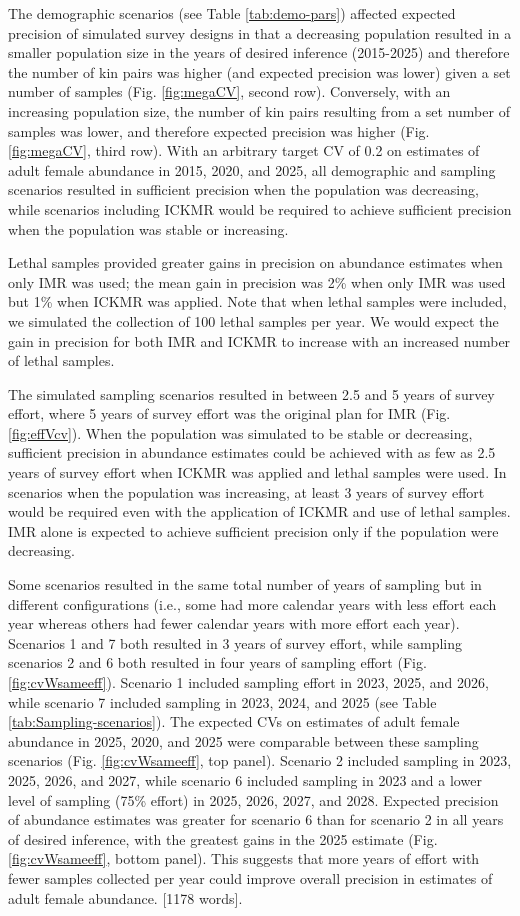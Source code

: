 The demographic scenarios (see Table \ref{tab:demo-pars}) affected
expected precision of simulated survey designs in that a decreasing
population resulted in a smaller population size in the years of desired
inference (2015-2025) and therefore the number of kin pairs was higher
(and expected precision was lower) given a set number of samples (Fig.
\ref{fig:megaCV}, second row). Conversely, with an increasing population
size, the number of kin pairs resulting from a set number of samples
was lower, and therefore expected precision was higher (Fig. \ref{fig:megaCV},
third row). With an arbitrary target CV of 0.2 on estimates of adult
female abundance in 2015, 2020, and 2025, all demographic and sampling
scenarios resulted in sufficient precision when the population was
decreasing, while scenarios including ICKMR would be required to achieve
sufficient precision when the population was stable or increasing. 

Lethal samples provided greater gains in precision on abundance estimates
when only IMR was used; the mean gain in precision was 2\% when only
IMR was used but 1\% when ICKMR was applied. Note that when lethal
samples were included, we simulated the collection of 100 lethal samples
per year. We would expect the gain in precision for both IMR and ICKMR
to increase with an increased number of lethal samples. 

The simulated sampling scenarios resulted in between 2.5 and 5 years
of survey effort, where 5 years of survey effort was the original
plan for IMR (Fig. \ref{fig:effVcv}). When the population was simulated
to be stable or decreasing, sufficient precision in abundance estimates
could be achieved with as few as 2.5 years of survey effort when ICKMR
was applied and lethal samples were used. In scenarios when the population
was increasing, at least 3 years of survey effort would be required
even with the application of ICKMR and use of lethal samples. IMR
alone is expected to achieve sufficient precision only if the population
were decreasing. 

Some scenarios resulted in the same total number of years of sampling
but in different configurations (i.e., some had more calendar years
with less effort each year whereas others had fewer calendar years
with more effort each year). Scenarios 1 and 7 both resulted in 3
years of survey effort, while sampling scenarios 2 and 6 both resulted
in four years of sampling effort (Fig. \ref{fig:cvWsameeff}). Scenario
1 included sampling effort in 2023, 2025, and 2026, while scenario
7 included sampling in 2023, 2024, and 2025 (see Table \ref{tab:Sampling-scenarios}).
The expected CVs on estimates of adult female abundance in 2025, 2020,
and 2025 were comparable between these sampling scenarios (Fig. \ref{fig:cvWsameeff},
top panel). Scenario 2 included sampling in 2023, 2025, 2026, and
2027, while scenario 6 included sampling in 2023 and a lower level
of sampling (75\% effort) in 2025, 2026, 2027, and 2028. Expected
precision of abundance estimates was greater for scenario 6 than for
scenario 2 in all years of desired inference, with the greatest gains
in the 2025 estimate (Fig. \ref{fig:cvWsameeff}, bottom panel). This
suggests that more years of effort with fewer samples collected per
year could improve overall precision in estimates of adult female
abundance. {[}1178 words{]}.
